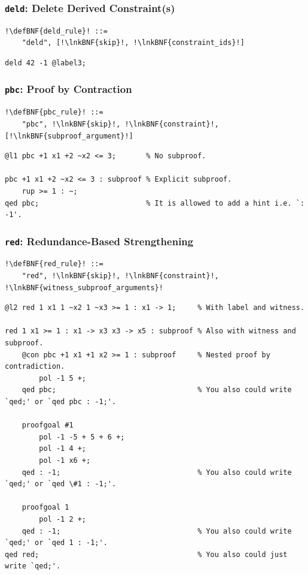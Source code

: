 \documentclass[a4paper]{article}
\newcommand{\defBNF}[1]{\hypertarget{def:#1}{<\detokenize{#1}>}}
\newcommand{\lnkBNF}[1]{\hyperlink{def:#1}{<\detokenize{#1}>}}
\begin{document}
\subsubsection{\texttt{deld}: Delete Derived Constraint(s)}\label{sec:rules-deld}
\begin{lstlisting}
!\defBNF{deld_rule}! ::=
	"deld", [!\lnkBNF{skip}!, !\lnkBNF{constraint_ids}!]
\end{lstlisting}
\begin{lstlisting}[language=veripb]
deld 42 -1 @label3;
\end{lstlisting}


\subsubsection{\texttt{pbc}: Proof by Contraction}\label{sec:pbc}
\begin{lstlisting}
!\defBNF{pbc_rule}! ::=
	"pbc", !\lnkBNF{skip}!, !\lnkBNF{constraint}!, [!\lnkBNF{subproof_argument}!]
\end{lstlisting}
\begin{lstlisting}[language=veripb]
@l1 pbc +1 x1 +2 ~x2 <= 3;       % No subproof.

pbc +1 x1 +2 ~x2 <= 3 : subproof % Explicit subproof.
	rup >= 1 : ~;
qed pbc;                         % It is allowed to add a hint i.e. `: -1'.
\end{lstlisting}


\subsubsection{\texttt{red}: Redundance-Based Strengthening}\label{sec:rules-red}
\begin{lstlisting}
!\defBNF{red_rule}! ::=
	"red", !\lnkBNF{skip}!, !\lnkBNF{constraint}!, !\lnkBNF{witness_subproof_arguments}!
\end{lstlisting}
\begin{lstlisting}[language=veripb]
@l2 red 1 x1 1 ~x2 1 ~x3 >= 1 : x1 -> 1;     % With label and witness.

red 1 x1 >= 1 : x1 -> x3 x3 -> x5 : subproof % Also with witness and subproof.
	@con pbc +1 x1 +1 x2 >= 1 : subproof     % Nested proof by contradiction.
		pol -1 5 +;
	qed pbc;                                 % You also could write `qed;' or `qed pbc : -1;'.

	proofgoal #1
		pol -1 -5 + 5 + 6 +;
		pol -1 4 +;
		pol -1 x6 +;
	qed : -1;                                % You also could write `qed;' or `qed \#1 : -1;'.

	proofgoal 1
		pol -1 2 +;
	qed : -1;                                % You also could write `qed;' or `qed 1 : -1;'.
qed red;                                     % You also could just write `qed;'.
\end{lstlisting}
\end{document}
